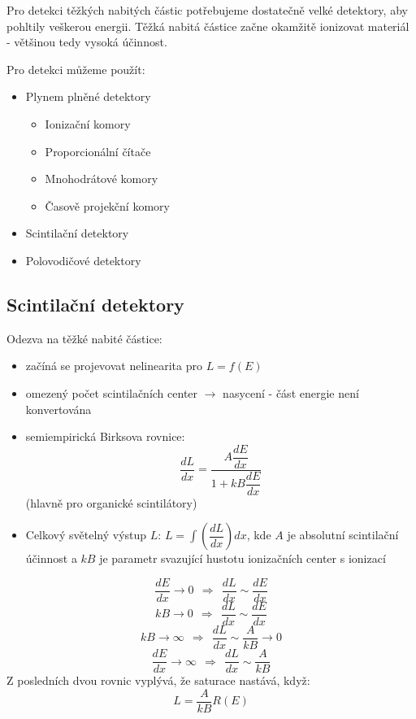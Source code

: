 \documentclass[../../main.tex]{subfiles}
\begin{document}
Pro detekci těžkých nabitých částic potřebujeme dostatečně velké detektory, aby pohltily veškerou energii. Těžká nabitá částice začne okamžitě ionizovat materiál - většinou tedy vysoká účinnost.

Pro detekci můžeme použít:
\begin{itemize}
	\item Plynem plněné detektory
	\begin{itemize}
		\item Ionizační komory
		\item Proporcionální čítače
		\item Mnohodrátové komory
		\item Časově projekční komory
	\end{itemize}
	\item Scintilační detektory
	\item Polovodičové detektory
\end{itemize} 

\subsection{Scintilační detektory}

Odezva na těžké nabité částice:
\begin{itemize}
	\item začíná se projevovat nelinearita pro $L = f(E)$
	\item omezený počet scintilačních center $\rightarrow$ nasycení - část energie není konvertována 
	\item semiempirická Birksova rovnice: 
	\begin{equation}
	   \dfrac{dL}{dx} = \dfrac{A \dfrac{dE}{dx}}{1 + kB \dfrac{dE}{dx}}
	\end{equation}
	(hlavně pro organické scintilátory)
	\item Celkový světelný výstup $L$: $L = \int \left( \dfrac{dL}{dx}\right) dx$, kde $A$ je absolutní scintilační účinnost a $kB$ je parametr svazující hustotu ionizačních center s ionizací 
\end{itemize}
\begin{equation}
\dfrac{dE}{dx} \rightarrow 0 ~~ \Rightarrow ~~ \dfrac{dL}{dx} \sim \dfrac{dE}{dx}
\end{equation}
\begin{equation}
kB \rightarrow 0 ~~ \Rightarrow ~~ \dfrac{dL}{dx} \sim \dfrac{dE}{dx}
\end{equation}
\begin{equation}
kB \rightarrow \infty ~~ \Rightarrow ~~ \dfrac{dL}{dx} \sim \dfrac{A}{kB} \rightarrow 0
\end{equation}
\begin{equation}
\dfrac{dE}{dx} \rightarrow \infty ~~ \Rightarrow ~~ \dfrac{dL}{dx} \sim \dfrac{A}{kB}
\end{equation}
Z posledních dvou rovnic vyplývá, že saturace nastává, když:
\begin{equation}
L = \dfrac{A}{kB} R(E)
\end{equation}
\end{document}
